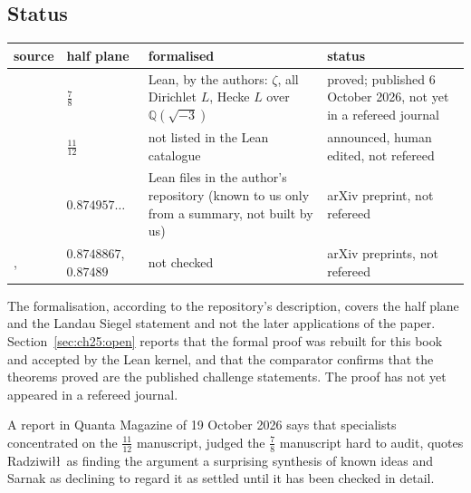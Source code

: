 
\subsection{Status}

\begin{center}\footnotesize
\begin{tabular}{p{}p{}p{}p{}}
\toprule
source & half plane & formalised & status\\
\midrule
\cite{OAI26a} & $\frac78$ & Lean, by the authors: $\zeta$, all Dirichlet $L$, Hecke $L$ over $\mathbb Q(\sqrt{-3})$ & proved; published 6 October 2026, not yet in a refereed journal\\
\cite{OAI26b} & $\frac{11}{12}$ & not listed in the Lean catalogue & announced, human edited, not refereed\\
\cite{Liu26a} & $0.874957\ldots$ & Lean files in the author's repository (known to us only from a summary, not built by us) & arXiv preprint, not refereed\\
\cite{XuSang26}, \cite{Liu26b} & $0.8748867$, $0.87489$ & not checked & arXiv preprints, not refereed\\
\bottomrule
\end{tabular}
\end{center}

The formalisation, according to the repository's description, covers the half plane and the Landau Siegel statement and not the later applications of the paper. Section~\ref{sec:ch25:open} reports that the formal proof was rebuilt for this book and accepted by the Lean kernel, and that the comparator confirms that the theorems proved are the published challenge statements. The proof has not yet appeared in a refereed journal.

A report in Quanta Magazine of 19 October 2026 \cite{NCQuanta26} says that specialists concentrated on the $\frac{11}{12}$ manuscript, judged the $\frac78$ manuscript hard to audit, quotes Radziwi\l\l\ as finding the argument a surprising synthesis of known ideas and Sarnak as declining to regard it as settled until it has been checked in detail.



